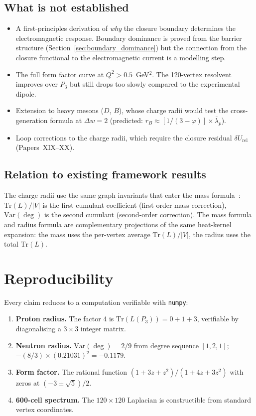 \documentclass[12pt]{article}
\newcommand{\phig}{\varphi}
\newcommand{\lbar}{\bar{\lambda}}
\begin{document}
\subsection{What is not established}

\begin{itemize}
    \item A first-principles derivation of \textit{why} the closure boundary determines the electromagnetic response. Boundary dominance is proved from the barrier structure (Section~\ref{sec:boundary_dominance}) but the connection from the closure functional to the electromagnetic current is a modelling step.
    \item The full form factor curve at $Q^2 > 0.5$~GeV$^2$. The 120-vertex resolvent improves over $P_3$ but still drops too slowly compared to the experimental dipole.
    \item Extension to heavy mesons ($D$, $B$), whose charge radii would test the cross-generation formula at $\Delta w = 2$ (predicted: $r_B \approx [1/(3-\phig)] \times \lbar_p$).
    \item Loop corrections to the charge radii, which require the closure residual $\delta U_{\mathrm{rel}}$ (Papers~XIX--XX).
\end{itemize}

\subsection{Relation to existing framework results}

The charge radii use the same graph invariants that enter the mass formula~\citep{SmartIV}: $\mathrm{Tr}(L)/|V|$ is the first cumulant coefficient (first-order mass correction), $\mathrm{Var}(\deg)$ is the second cumulant (second-order correction). The mass formula and radius formula are complementary projections of the same heat-kernel expansion: the mass uses the per-vertex average $\mathrm{Tr}(L)/|V|$, the radius uses the total $\mathrm{Tr}(L)$.

\section{Reproducibility}\label{sec:reproducibility}

Every claim reduces to a computation verifiable with \texttt{numpy}:
\begin{enumerate}
    \item \textbf{Proton radius.} The factor 4 is $\mathrm{Tr}(L(P_3)) = 0 + 1 + 3$, verifiable by diagonalising a $3 \times 3$ integer matrix.
    \item \textbf{Neutron radius.} $\mathrm{Var}(\deg) = 2/9$ from degree sequence $[1,2,1]$; $-(8/3) \times (0.21031)^2 = -0.1179$.
    \item \textbf{Form factor.} The rational function $(1+3z+z^2)/(1+4z+3z^2)$ with zeros at $(-3\pm\sqrt{5})/2$.
    \item \textbf{600-cell spectrum.} The $120 \times 120$ Laplacian is constructible from standard vertex coordinates.
\end{enumerate}
\end{document}
